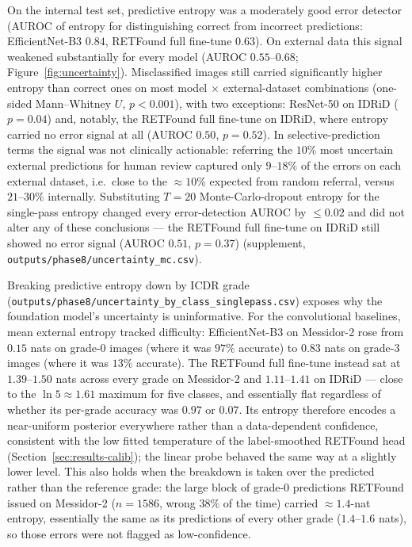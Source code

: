 \documentclass[journal]{IEEEtran}
\begin{document}
On the internal test set, predictive entropy was a moderately good error detector
(AUROC of entropy for distinguishing correct from incorrect predictions:
EfficientNet-B3 $0.84$, RETFound full fine-tune $0.63$). On external data this
signal weakened substantially for every model (AUROC $0.55$--$0.68$;
Figure~\ref{fig:uncertainty}). Misclassified images still carried significantly
higher entropy than correct ones on most model $\times$ external-dataset
combinations (one-sided Mann--Whitney $U$, $p<0.001$), with two exceptions:
ResNet-50 on IDRiD ($p=0.04$) and, notably, the RETFound full fine-tune on IDRiD,
where entropy carried no error signal at all (AUROC $0.50$, $p=0.52$). In
selective-prediction terms the signal was not clinically actionable: referring
the $10\%$ most uncertain external predictions for human review captured only
$9$--$18\%$ of the errors on each external dataset, i.e.\ close to the
$\approx 10\%$ expected from random referral, versus $21$--$30\%$ internally.
Substituting $T=20$ Monte-Carlo-dropout entropy for the single-pass entropy
changed every error-detection AUROC by $\leq 0.02$ and did not alter any of these
conclusions --- the RETFound full fine-tune on IDRiD still showed no error signal
(AUROC $0.51$, $p=0.37$) (supplement,
\texttt{outputs/phase8/uncertainty\_mc.csv}).

Breaking predictive entropy down by ICDR grade
(\texttt{outputs/phase8/uncertainty\_by\_class\_singlepass.csv}) exposes why the
foundation model's uncertainty is uninformative. For the convolutional baselines,
mean external entropy tracked difficulty: EfficientNet-B3 on Messidor-2 rose from
$0.15$ nats on grade-0 images (where it was $97\%$ accurate) to $0.83$ nats on
grade-3 images (where it was $13\%$ accurate). The RETFound full fine-tune instead
sat at $1.39$--$1.50$ nats across every grade on Messidor-2 and $1.11$--$1.41$ on
IDRiD --- close to the $\ln 5 \approx 1.61$ maximum for five classes, and
essentially flat regardless of whether its per-grade accuracy was $0.97$ or
$0.07$. Its entropy therefore encodes a near-uniform posterior everywhere rather
than a data-dependent confidence, consistent with the low fitted temperature of
the label-smoothed RETFound head (Section~\ref{sec:results-calib}); the linear
probe behaved the same way at a slightly lower level. This also holds when the
breakdown is taken over the predicted rather than the reference grade: the large
block of grade-0 predictions RETFound issued on Messidor-2 ($n=1586$, wrong $38\%$
of the time) carried $\approx 1.4$-nat entropy, essentially the same as its
predictions of every other grade ($1.4$--$1.6$ nats), so those errors were not
flagged as low-confidence.
\end{document}
